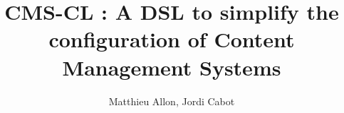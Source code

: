 \title{CMS-CL : A DSL to simplify the configuration of Content Management Systems}
\author{Matthieu Allon, Jordi Cabot}
